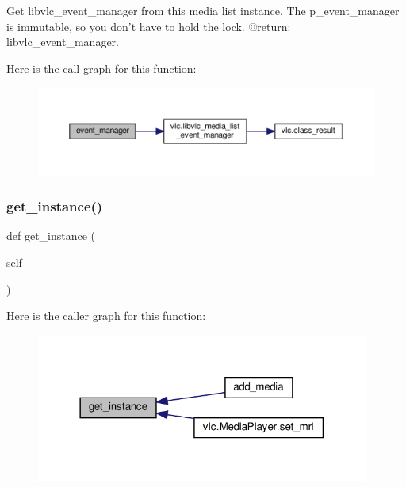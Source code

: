 \begin{DoxyVerb}Get libvlc_event_manager from this media list instance.
The p_event_manager is immutable, so you don't have to hold the lock.
@return: libvlc_event_manager.
\end{DoxyVerb}
 Here is the call graph for this function\+:
\nopagebreak
\begin{figure}[H]
\begin{center}
\leavevmode
\includegraphics[width=350pt]{classvlc_1_1_media_list_ab7c92812cd259eb8e4e4fd292b81bfaa_cgraph}
\end{center}
\end{figure}
\mbox{\label{classvlc_1_1_media_list_a56c15bafa43c856366863fc07fc4021f}} 
\subsubsection{\texorpdfstring{get\+\_\+instance()}{get\_instance()}}
{\footnotesize\ttfamily def get\+\_\+instance (\begin{DoxyParamCaption}\item[{}]{self }\end{DoxyParamCaption})}

Here is the caller graph for this function\+:
\nopagebreak
\begin{figure}[H]
\begin{center}
\leavevmode
\includegraphics[width=310pt]{classvlc_1_1_media_list_a56c15bafa43c856366863fc07fc4021f_icgraph}
\end{center}
\end{figure}
\mbox{\label{classvlc_1_1_media_list_ac1a99349b013539c8620478519a72f81}} 
